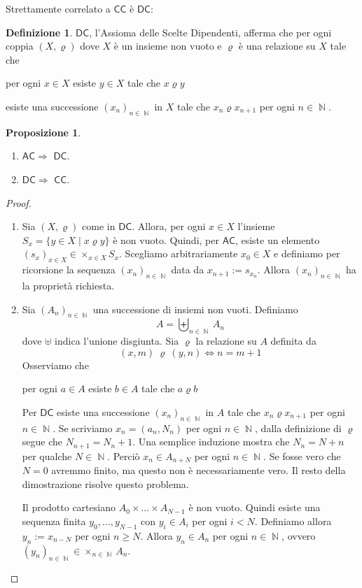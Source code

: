 \documentclass[12pt,a4paper]{report}
\theoremstyle{definition}
\newtheorem{defn}[teo]{Definizione}  %
\newtheorem{prop}[teo]{Proposizione}  %
\theoremstyle{num.custom-title}
\DeclareMathOperator{\N}{\mathbb{N}}
\newcommand{\AC}{\ensuremath{\mathsf{AC}}\xspace}
\newcommand{\CC}{\ensuremath{\mathsf{CC}}\xspace}
\newcommand{\DC}{\ensuremath{\mathsf{DC}}\xspace}
\begin{document}
Strettamente correlato a \CC è \DC:

\begin{defn}
\DC, l'Assioma delle Scelte Dipendenti, afferma che per ogni coppia $(X,\varrho)$ dove $X$ è un insieme non vuoto e $\varrho$ è una relazione su $X$ tale che 
\begin{center}
per ogni $x \in X$ esiste $y \in X$ tale che $x \varrho y$
\end{center}
esiste una successione $(x_n)_{n \in \N}$ in $X$ tale che $x_n \varrho x_{n+1}$ per ogni $n \in \N$.
\end{defn}

\begin{prop}\ 
\begin{enumerate}
\item \AC $\Rightarrow$ \DC.
\item \DC $\Rightarrow$ \CC.
\end{enumerate}
\begin{proof}
\begin{enumerate}
\item Sia $(X,\varrho)$ come in \DC. Allora, per ogni $x \in X$ l'insieme $S_x=\{y \in X \mid x \varrho y\}$ è non vuoto. Quindi, per \AC, esiste un elemento $(s_x)_{x \in X} \in \times_{x \in X} S_x$. Scegliamo arbitrariamente $x_0 \in X$ e definiamo per ricorsione la sequenza $(x_n)_{n \in \N}$ data da $x_{n+1}:=s_{x_n}$. Allora $(x_n)_{n \in \N}$ ha la proprietà richiesta.
\item Sia $(A_n)_{n \in \N}$ una successione di insiemi non vuoti. Definiamo
\[
A = \biguplus_{n \in \N} A_n
\]
dove $\uplus$ indica l'unione disgiunta. Sia $\varrho$ la relazione su $A$ definita da
\[
(x,m) \ \varrho \ (y,n) \iff n=m+1
\]
Osserviamo che 
\begin{center}
per ogni $a \in A$ esiste $b \in A$ tale che $a \varrho b$
\end{center}
Per \DC esiste una successione $(x_n)_{n \in \N}$ in $A$ tale che $x_n \varrho x_{n+1}$ per ogni $n \in \N$. Se scriviamo $x_n = (a_n, N_n)$ per ogni $n \in \N$, dalla definizione di $\varrho$ segue che $N_{n+1} = N_n + 1$. Una semplice induzione mostra che $N_n = N+n$ per qualche $N \in \N$. Perciò $x_n \in A_{n+N}$ per ogni $n \in \N$. Se fosse vero che $N=0$ avremmo finito, ma questo non è necessariamente vero. Il resto della dimostrazione risolve questo problema.

Il prodotto cartesiano $A_0 \times ... \times A_{N-1}$ è non vuoto. Quindi esiste una sequenza finita $y_0,...,y_{N-1}$ con $y_i \in A_i$ per ogni $i<N$. Definiamo allora $y_n:=x_{n-N}$ per ogni $n \geq N$. Allora $y_n \in A_n$ per ogni $n \in \N$, ovvero $(y_n)_{n \in \N} \in \times_{n \in \N} A_n$.
\end{enumerate}
\end{proof}
\end{prop}
\end{document}
